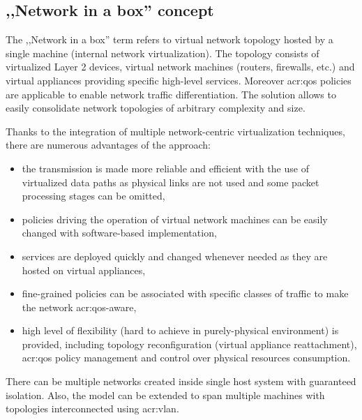 \documentclass[11pt]{book}
\begin{document}
      \subsection{,,Network in a box'' concept}

        The ,,Network in a box'' term refers to virtual network topology hosted by a single machine (internal network
        virtualization). The topology consists of virtualized Layer 2 devices, virtual network machines (routers,
        firewalls, etc.) and virtual appliances providing specific high-level services. Moreover \gls{acr:qos} policies
        are applicable to enable network traffic differentiation. The solution allows to easily consolidate network
        topologies of arbitrary complexity and size.

        Thanks to the integration of multiple network-centric virtualization techniques, there are numerous advantages
        of the approach:

        \begin{itemize}

          \item the transmission is made more reliable and efficient with the use of virtualized data paths as physical
                links are not used and some packet processing stages can be omitted,

          \item policies driving the operation of virtual network machines can be easily changed with software-based
                implementation,

          \item services are deployed quickly and changed whenever needed as they are hosted on virtual appliances,

          \item fine-grained policies can be associated with specific classes of traffic to make the network
                \gls{acr:qos}-aware,

          \item high level of flexibility (hard to achieve in purely-physical environment) is provided, including
                topology reconfiguration (virtual appliance reattachment), \gls{acr:qos} policy management and control
                over physical resources consumption.
        
        \end{itemize}

        There can be multiple networks created inside single host system with guaranteed isolation. Also, the model can
        be extended to span multiple machines with topologies interconnected using \gls{acr:vlan}.
\end{document}
